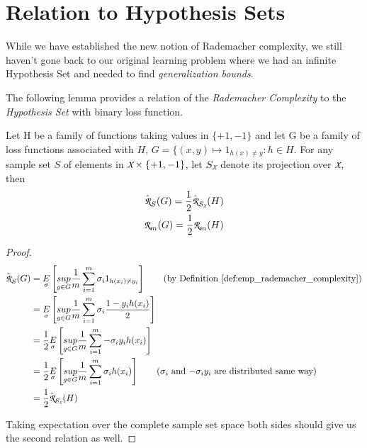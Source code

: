 \documentclass[../toml]{subfiles}
\begin{document}
\section{Relation to Hypothesis Sets}

While we have established the new notion of Rademacher complexity, we still haven't
gone back to our original learning problem where we had an infinite Hypothesis Set
and needed to find \textit{generalization bounds}.

The following lemma provides a relation of the \textit{Rademacher Complexity} to the
\textit{Hypothesis Set} with binary loss function.

\begin{lemma} \label{lem:rademacher_hyposets}
Let H be a family of functions taking values in $\{+1,-1\}$ and let G be a family of loss
functions associated with $H$, $G = \{(x,y) \mapsto 1_{h(x)\neq y} : h \in H$. For any
sample set $S$ of elements in $\cursive{X} \times \{+1,-1\}$, let $S_{\cursive{X}}$ denote
its projection over $\cursive{X}$, then
\begin{align}
\hat{\cursive{R}}_S(G) = \frac{1}{2}\hat{\cursive{R}}_{S_{\cursive{X}}}(H)\\
\cursive{R}_m(G) = \frac{1}{2}\cursive{R}_m(H)
\end{align}
\end{lemma}
\begin{proof}
\begin{align}
\hat{\cursive{R}}_S(G) &= \underset{\sigma}{E}\left[ \underset{g \in G}{sup} \frac{1}{m} \sum_{i=1}^{m} \sigma_i 1_{h(x_i)\neq y_i} \right] \tag{by Definition \ref{def:emp_rademacher_complexity}} \\
&= \underset{\sigma}{E}\left[ \underset{g \in G}{sup} \frac{1}{m} \sum_{i=1}^{m} \sigma_i \frac{1 - y_ih(x_i)}{2} \right] \nonumber \\
&= \frac{1}{2} \underset{\sigma}{E}\left[ \underset{g \in G}{sup} \frac{1}{m} \sum_{i=1}^{m} -\sigma_i y_ih(x_i) \right] \nonumber \\
&= \frac{1}{2} \underset{\sigma}{E}\left[ \underset{g \in G}{sup} \frac{1}{m} \sum_{i=1}^{m} \sigma_i h(x_i) \right] \tag{$\sigma_i$ and $-\sigma_iy_i$ are distributed same way} \\
&= \frac{1}{2} \hat{\cursive{R}}_{S_{\cursive{X}}}(H)
\end{align}

Taking expectation over the complete sample set space both sides should give us the
second relation as well.
\end{proof}
\end{document}
